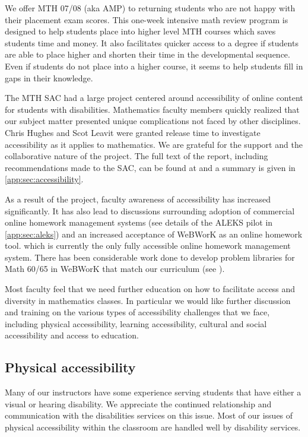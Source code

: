 We offer MTH 07/08 (aka AMP) to returning students who are not happy with their
placement exam scores. This one-week intensive math review program is designed
to help students place into higher level MTH courses which saves students time
and money. It also facilitates quicker access to a degree if students are able
to place higher and shorten their time in the developmental sequence.  Even if
students do not place into a higher course, it seems to help students fill in
gaps in their knowledge.

The MTH SAC had a large project centered around accessibility of online content
for students with disabilities. Mathematics faculty members quickly realized
that our subject matter presented unique complications not faced by other
disciplines. Chris Hughes and Scot Leavit were granted release time to
investigate accessibility as it applies to mathematics. We are grateful for the
support and the collaborative nature of the project.\label{needs:page:disabilityservices} 
The full text of the
report, including recommendations made to the SAC, can be found at
\cite{accessibilityproject} and a summary is given in
\vref{app:sec:accessibility}.

As a result of the project, faculty awareness of accessibility has increased
significantly. It has also lead to discussions surrounding adoption of
commercial online homework management systems (see details of the ALEKS pilot
in \vref{app:sec:aleks}) and an increased acceptance of WeBWorK as an online
homework tool. which is currently the only fully accessible online homework
management system. There has been considerable work done to develop problem
libraries for Math 60/65 in WeBWorK that match our curriculum (see
).

Most faculty feel that we need further education on how to facilitate access
and diversity in mathematics classes. In particular we would like further
discussion and training on the various types of accessibility challenges that
we face, including physical accessibility, learning accessibility, cultural and
social accessibility and access to education.

\subsection{Physical accessibility}
Many of our instructors have some experience serving students that have either
a visual or hearing disability. We appreciate the continued relationship and
communication with the disabilities services on this issue. Most of our issues
of physical accessibility within the classroom are handled well by disability
services. 

